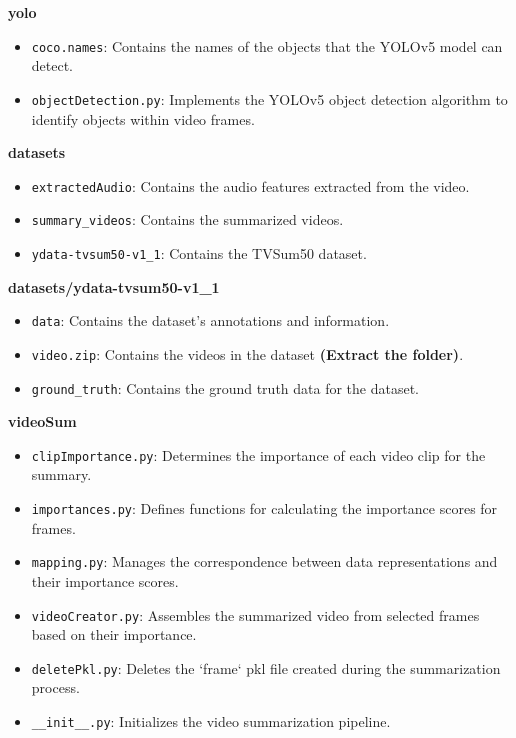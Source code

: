 \documentclass[conference]{IEEEtran}
\begin{document}
\textbf{yolo}
\begin{itemize}
    \item \texttt{coco.names}: Contains the names of the objects that the YOLOv5 model can detect.
    \item \texttt{objectDetection.py}: Implements the YOLOv5 object detection algorithm to identify objects within video frames.
\end{itemize}

\textbf{datasets}
\begin{itemize}
    \item \texttt{extractedAudio}: Contains the audio features extracted from the video.
    \item \texttt{summary\_videos}: Contains the summarized videos.
    \item \texttt{ydata-tvsum50-v1\_1}: Contains the TVSum50 dataset.
\end{itemize}

\textbf{datasets/ydata-tvsum50-v1\_1}
\begin{itemize}
    \item \texttt{data}: Contains the dataset's annotations and information.
    \item \texttt{video.zip}: Contains the videos in the dataset \textbf{(Extract the folder)}.
    \item \texttt{ground\_truth}: Contains the ground truth data for the dataset.
\end{itemize}

\textbf{videoSum}
\begin{itemize}
    \item \texttt{clipImportance.py}: Determines the importance of each video clip for the summary.
    \item \texttt{importances.py}: Defines functions for calculating the importance scores for frames.
    \item \texttt{mapping.py}: Manages the correspondence between data representations and their importance scores.
    \item \texttt{videoCreator.py}: Assembles the summarized video from selected frames based on their importance.
    \item \texttt{deletePkl.py}: Deletes the `frame` pkl file created during the summarization process.
    \item \texttt{\_\_init\_\_.py}: Initializes the video summarization pipeline.
\end{itemize}
\end{document}
